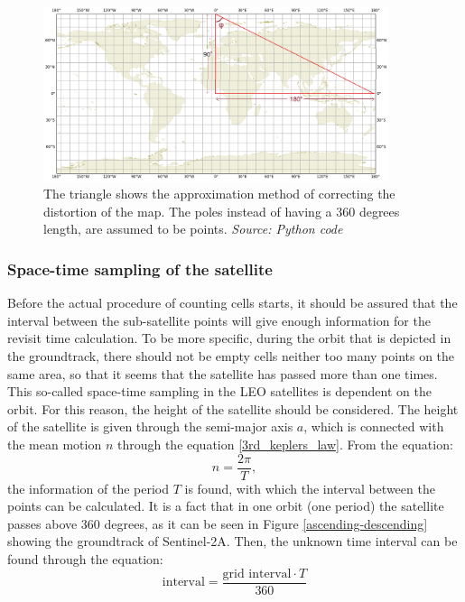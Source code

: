 \begin{figure}
\centering
\includegraphics[width=0.9\textwidth]{Images/correction_map_distortion.png}\caption{The triangle shows the approximation method of correcting the distortion of the map. The poles instead of having a 360 degrees length, are assumed to be points. \textit{Source: Python code}}
\label{correction_map_distortion}
\end{figure}

\bigskip
\subsubsection{Space-time sampling of the satellite}
\bigskip

Before the actual procedure of counting cells starts, it should be assured that the interval between the sub-satellite points will give enough information for the revisit time calculation. To be more specific, during the orbit that is depicted in the groundtrack, there should not be empty cells neither too many points on the same area, so that it seems that the satellite has passed more than one times. This so-called space-time sampling in the LEO satellites is dependent on the orbit. For this reason, the height of the satellite should be considered. The height of the satellite is given through the semi-major axis $a$, which is connected with the mean motion $n$ through the equation \ref{3rd_keplers_law}. From the equation: $$n = \frac{2 \pi}{T}, $$
the information of the period $T$ is found, with which the interval between the points can be calculated. It is a fact that in one orbit (one period) the satellite passes above 360 degrees, as it can be seen in Figure \ref{ascending-descending} showing the groundtrack of Sentinel-2A. Then, the unknown time interval can be found through the equation:
\begin{equation}
\text{interval} = \frac{\text{grid interval} \cdot T}{360}
\end{equation}

